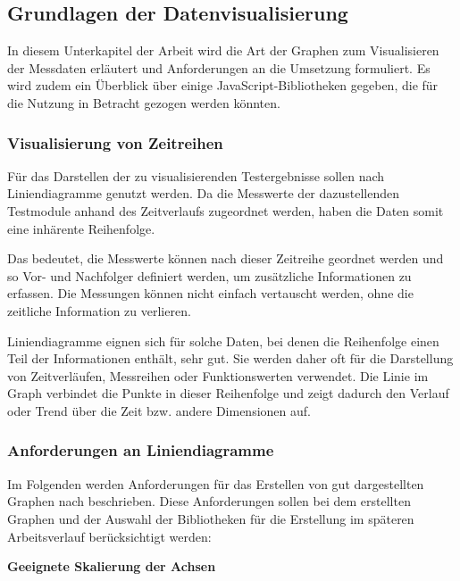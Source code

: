 \subsection{Grundlagen der Datenvisualisierung}
\label{subsec:grundlagen-der-datenvisualisierung}

In diesem Unterkapitel der Arbeit wird die Art der Graphen zum Visualisieren der Messdaten erläutert und Anforderungen an die Umsetzung formuliert.
Es wird zudem ein Überblick über einige JavaScript-Bibliotheken gegeben, die für die Nutzung in Betracht gezogen werden könnten.

\subsubsection{Visualisierung von Zeitreihen}

Für das Darstellen der zu visualisierenden Testergebnisse sollen nach \cite{Wilke2020Datenvisualisierung} Liniendiagramme genutzt werden.
Da die Messwerte der dazustellenden Testmodule anhand des Zeitverlaufs zugeordnet werden, haben die Daten somit eine inhärente Reihenfolge.

Das bedeutet, die Messwerte können nach dieser Zeitreihe geordnet werden und so Vor- und Nachfolger definiert werden, um zusätzliche Informationen zu erfassen.
Die Messungen können nicht einfach vertauscht werden, ohne die zeitliche Information zu verlieren.


Liniendiagramme eignen sich für solche Daten, bei denen die Reihenfolge einen Teil der Informationen enthält, sehr gut.
Sie werden daher oft für die Darstellung von Zeitverläufen, Messreihen oder Funktionswerten verwendet.
Die Linie im Graph verbindet die Punkte in dieser Reihenfolge und zeigt dadurch den Verlauf oder Trend über die Zeit bzw. andere Dimensionen auf. \cite{Wilke2020Datenvisualisierung}


\subsubsection{Anforderungen an Liniendiagramme}

Im Folgenden werden Anforderungen für das Erstellen von gut dargestellten Graphen nach \cite{Wilke2020Datenvisualisierung} beschrieben.
Diese Anforderungen sollen bei dem erstellten Graphen und der Auswahl der Bibliotheken für die Erstellung im späteren Arbeitsverlauf berücksichtigt werden: \cite{Wilke2020Datenvisualisierung}

\item
\textbf{Geeignete Skalierung der Achsen}

